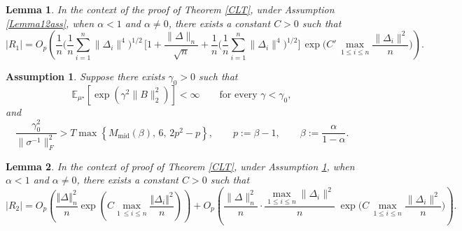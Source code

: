 \documentclass[11pt]{article}
\newtheorem{lemma}{Lemma}
\newtheorem{assumption}{Assumption}
\theoremstyle{definition}
\newcommand{\E}{\mathbb{E}}
\begin{document}
\begin{lemma}\label{negalphaR1}
In the context of the proof of Theorem \ref{CLT}, under Assumption \ref{Lemma12ass}, when $\alpha < 1$ and $\alpha \neq 0$, there exists a constant $C > 0$ such that
\[
|R_1|
= O_p\!\left(
\frac{1}{n}\Big(\frac{1}{n}\sum_{i=1}^n \|\Delta_i\|^4\Big)^{\!1/2}\,
\Big[1+\frac{\|\Delta\|_n}{\sqrt{n}}+\frac{1}{n}\Big(\frac{1}{n}\sum_{i=1}^n \|\Delta_i\|^4\Big)^{\!1/2}\Big]\,
\exp\!\Big(C'\,\max_{1\le i\le n}\frac{\|\Delta_i\|^2}{n}\Big)
\right).
\]
\end{lemma}


\begin{assumption}\label{Lemma13ass}
Suppose there exists $\gamma_0>0$ such that
\[
\E_{\mu^\star}
\left[
\exp\!\left(\gamma^2\|B\|_2^2\right)
\right]
<\infty
\qquad
\text{for every }\gamma<\gamma_0,
\]
and
\[
\frac{\gamma_0^2}{\|\sigma^{-1}\|_F^2}
>
T\max\left\{
M_{\mathrm{mid}}(\beta),\,
6,\,
2p^2-p
\right\},
\qquad
p:=\beta-1,
\qquad
\beta:=\frac{\alpha}{1-\alpha}.
\]
\end{assumption}

\begin{lemma}\label{boundR2}
In the context of proof of Theorem \ref{CLT}, under Assumption \ref{Lemma13ass}, when $\alpha < 1$ and $\alpha \neq 0$, there exists a constant $C > 0$ such that
$$|R_2| = O_p\left(\frac{\left\Vert \Delta\right\Vert_n^2}{n}\exp\left(C\max_{1\ \leq i \leq n}\frac{\left\Vert \Delta_i\right\Vert^2}{n}\right)\right) + O_p\!\left(
\frac{\|\Delta\|_n^2}{n}\cdot \frac{\max_{1\le i\le n}\|\Delta_i\|^2}{n}\;
\exp\!\Big(C\,\max_{1\le i\le n}\frac{\|\Delta_i\|^2}{n}\Big)
\right).$$
\end{lemma}
\end{document}
